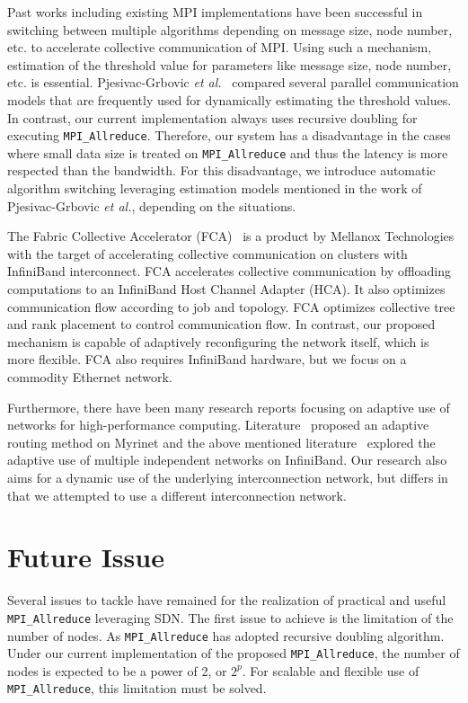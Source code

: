 Past works including existing MPI implementations have been successful
in switching between multiple algorithms depending on message size, node
number, etc. to accelerate collective communication of MPI\@. Using such a
mechanism, estimation of the threshold value for parameters like message size,
node number, etc. is essential. Pjesivac-Grbovic \emph{et
al.}~\cite{PjesivacGrbovic} compared several parallel communication models
that are frequently used for dynamically estimating the threshold values. In
contrast, our current implementation always uses recursive doubling for
executing \texttt{MPI\_Allreduce}. Therefore, our system has a disadvantage in
the cases where small data size is treated on \texttt{MPI\_Allreduce} and thus
the latency is more respected than the bandwidth. For this disadvantage, we
introduce automatic algorithm switching leveraging estimation models mentioned
in the work of Pjesivac-Grbovic \emph{et al.}, depending on the situations.

The Fabric Collective Accelerator (FCA)~\cite{fca} is a product by
Mellanox Technologies with the target of accelerating collective
communication on clusters with InfiniBand interconnect. FCA accelerates
collective communication by offloading computations to an InfiniBand
Host Channel Adapter (HCA). It also optimizes communication flow
according to job and topology. FCA optimizes collective tree and rank
placement to control communication flow. In contrast, our proposed
mechanism is capable of adaptively reconfiguring the network itself,
which is more flexible. FCA also requires InfiniBand hardware, but we
focus on a commodity Ethernet network.

Furthermore, there have been many research reports focusing on adaptive
use of networks for high-performance computing. Literature~\cite{Geoffray2008}
proposed an adaptive routing method on Myrinet and the above mentioned
literature~\cite{Jiuxing2004} explored the adaptive use of multiple
independent networks on InfiniBand. Our research also aims for a dynamic use
of the underlying interconnection network, but differs in that we attempted to
use a different interconnection network.

\hypertarget{future-issue}{%
\section{Future Issue}\label{future-issue}}

Several issues to tackle have remained for the realization of practical
and useful \texttt{MPI\_Allreduce} leveraging SDN\@. The first issue to
achieve is the limitation of the number of nodes. As
\texttt{MPI\_Allreduce} has adopted recursive doubling algorithm. Under
our current implementation of the proposed \texttt{MPI\_Allreduce}, the
number of nodes is expected to be a power of 2, or \(2^p\). For scalable
and flexible use of \texttt{MPI\_Allreduce}, this limitation must be
solved.

